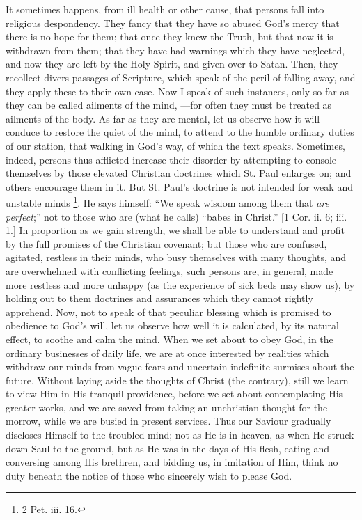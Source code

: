 It sometimes happens, from ill health or other cause,
that persons fall into religious despondency. They fancy
that they have so abused God's mercy that there is no
hope for them; that once they knew the Truth, but that
now it is withdrawn from them; that they have had
warnings which they have neglected, and now they are left
by the Holy Spirit, and given over to Satan. Then, they
recollect divers passages of Scripture, which speak of
the peril of falling away, and they apply these to their
own case. Now I speak of such instances, only so far as
they can be called ailments of the mind, —for often
they must be treated as ailments of the body. As far as
they are mental, let us observe how it will conduce to
restore the quiet of the mind, to attend to the humble
ordinary duties of our station, that walking in God's
way, of which the text speaks. Sometimes, indeed, persons
thus afflicted increase their disorder by attempting to
console themselves by those elevated Christian doctrines
which St. Paul enlarges on; and others encourage them in
it. But St. Paul's doctrine is not intended for weak and
unstable minds \footnote{2 Pet. iii. 16.}. He says himself:
``We speak wisdom among them that \emph{are perfect};''
not to those who are (what he calls) ``babes in
Christ.'' [1 Cor. ii. 6; iii. 1.] In proportion as we
gain strength, we shall be able to understand and profit
by the full promises of the Christian covenant; but those
who are confused, agitated, restless in their minds, who
busy themselves with many thoughts, and are overwhelmed
with conflicting feelings, such persons are, in general,
made more restless and more unhappy (as the experience of
sick beds may show us), by holding out to them doctrines
and assurances which they cannot rightly apprehend. Now,
not to speak of that peculiar blessing which is promised
to obedience to God's will, let us observe how well it is
calculated, by its natural effect, to soothe and calm the
mind. When we set about to obey God, in the ordinary
businesses of daily life, we are at once interested by
realities which withdraw our minds from vague fears and
uncertain indefinite surmises about the future. Without
laying aside the thoughts of Christ (the contrary), still
we learn to view Him in His tranquil providence, before
we set about contemplating His greater works, and we are
saved from taking an unchristian thought for the morrow,
while we are busied in present services. Thus our Saviour
gradually discloses Himself to the troubled mind; not as
He is in heaven, as when He struck down Saul to the
ground, but as He was in the days of His flesh, eating
and conversing among His brethren, and bidding us, in
imitation of Him, think no duty beneath the notice of
those who sincerely wish to please God.

